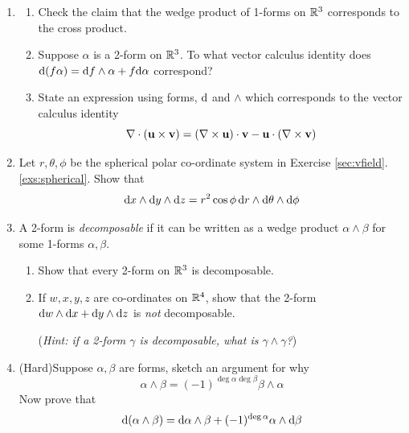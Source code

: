 \begin{exercises}
\begin{enumerate}
		
		\item\begin{enumerate}
		  \item Check the claim that the wedge product of 1-forms on $\mathbb{R}^3$ corresponds to the cross product.
		  \item Suppose $\alpha$ is a 2-form on $\mathbb{R}^3$. To what vector calculus identity does $\mathrm{d}(f\alpha)={\mathrm{d} f}\wedge\alpha+f\mathrm{d}\alpha$ correspond?
		  \item State an expression using forms, $\mathrm{d}$ and $\wedge$ which corresponds to the vector calculus identity
		  \[
		 		\nabla\cdot({\mathbf{u}}\times{\mathbf{v}}) =(\nabla\times{\mathbf{u}})\cdot{\mathbf{v}}-{\mathbf{u}}\cdot(\nabla\times{\mathbf{v}})
		 	\]
		\end{enumerate}
		
		
		\item Let $r,\theta,\phi$ be the spherical polar co-ordinate system in Exercise \ref*{sec:vfield}.\ref{exs:spherical}. Show that 
		\[
			{\mathrm{d} x}\wedge{\mathrm{d}y}\wedge{\mathrm{d}z}=r^2\cos\phi\,{\mathrm{d} r}\wedge{\mathrm{d}\theta}\wedge\mathrm{d}\phi
		\]
	
	
		\goodbreak
	
		\item A 2-form is \emph{decomposable} if it can be written as a wedge product $\alpha\wedge\beta$ for some 1-forms $\alpha,\beta$.
		\begin{enumerate}
		  \item Show that every 2-form on $\mathbb{R}^3$ is decomposable.
		  
		  \item If $w,x,y,z$ are co-ordinates on $\mathbb{R}^4$, show that the 2-form ${\mathrm{d} w}\wedge{\mathrm{d}x}+{\mathrm{d} y}\wedge{\mathrm{d}z}$ is \emph{not} decomposable.\par
		  (\emph{Hint: if a 2-form $\gamma$ is decomposable, what is $\gamma\wedge\gamma$?})
		\end{enumerate}
		
	
		
		\item (Hard)\lstsp Suppose $\alpha,\beta$ are forms, sketch an argument for why
		\[
			\alpha\wedge\beta=(-1)^{\deg\alpha\deg\beta}\beta\wedge\alpha
		\]
		Now prove that
		\[
			\mathrm{d}(\alpha\wedge\beta)=\mathrm{d}\alpha\wedge\beta+(-1)^{\operatorname{deg}\alpha}\alpha\wedge\mathrm{d}\beta
		\]
		

\end{enumerate}
\end{exercises}
